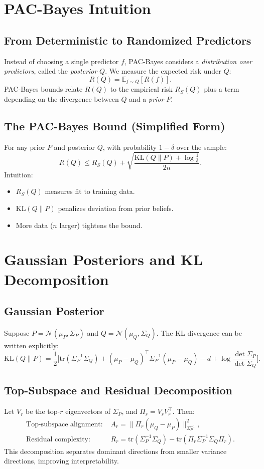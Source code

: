 \documentclass[11pt]{article}
\begin{document}
\section{PAC-Bayes Intuition}
\subsection{From Deterministic to Randomized Predictors}
Instead of choosing a single predictor $f$, PAC-Bayes considers a \emph{distribution over predictors}, called the \emph{posterior} $Q$. 
We measure the expected risk under $Q$:
\[
R(Q) = \mathbb{E}_{f\sim Q}[R(f)].
\]
PAC-Bayes bounds relate $R(Q)$ to the empirical risk $R_S(Q)$ plus a term depending on the divergence between $Q$ and a \emph{prior} $P$.

\subsection{The PAC-Bayes Bound (Simplified Form)}
For any prior $P$ and posterior $Q$, with probability $1-\delta$ over the sample:
\[
R(Q) \le R_S(Q) + \sqrt{\frac{\mathrm{KL}(Q\|P)+\log\frac{1}{\delta}}{2n}}.
\]
Intuition:
\begin{itemize}[noitemsep]
\item $R_S(Q)$ measures fit to training data.
\item $\mathrm{KL}(Q\|P)$ penalizes deviation from prior beliefs.
\item More data ($n$ larger) tightens the bound.
\end{itemize}

\section{Gaussian Posteriors and KL Decomposition}
\subsection{Gaussian Posterior}
Suppose $P = \mathcal{N}(\mu_P,\Sigma_P)$ and $Q = \mathcal{N}(\mu_Q,\Sigma_Q)$. 
The KL divergence can be written explicitly:
\[
\mathrm{KL}(Q\|P) = \frac{1}{2}\Big[ \mathrm{tr}(\Sigma_P^{-1}\Sigma_Q) + (\mu_P-\mu_Q)^\top \Sigma_P^{-1}(\mu_P-\mu_Q) - d + \log\frac{\det\Sigma_P}{\det\Sigma_Q}\Big].
\]

\subsection{Top-Subspace and Residual Decomposition}
Let $V_r$ be the top-$r$ eigenvectors of $\Sigma_P$, and $\Pi_r = V_r V_r^\top$. Then:
\begin{align*}
\text{Top-subspace alignment: } & A_r = \|\Pi_r (\mu_Q-\mu_P)\|_{\Sigma_P^{-1}}^2,\\
\text{Residual complexity: } & R_r = \mathrm{tr}(\Sigma_P^{-1}\Sigma_Q) - \mathrm{tr}(\Pi_r \Sigma_P^{-1}\Sigma_Q \Pi_r).
\end{align*}
This decomposition separates dominant directions from smaller variance directions, improving interpretability.
\end{document}

